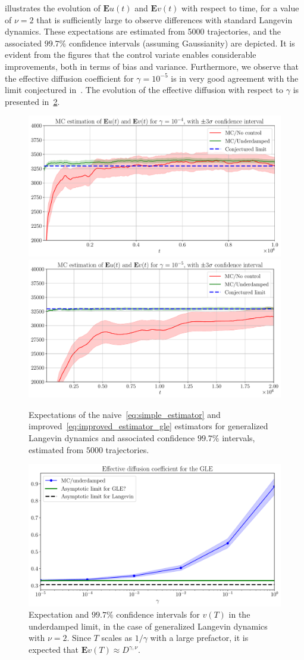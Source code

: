 \documentclass[11pt,a4paper]{article}
\newcommand{\expect}[0]{\mathbf{E}}
\theoremstyle{plain}
\numberwithin{equation}{section}
\begin{document}
 illustrates the evolution of $\expect u(t)$ and $\expect v(t)$ with respect to time,
for a value of $\nu = 2$ that is sufficiently large to observe differences with standard Langevin dynamics.
These expectations are estimated from 5000 trajectories,
and the associated $99.7\%$ confidence intervals (assuming Gaussianity) are depicted.
It is evident from the figures that the control variate enables considerable improvements,
both in terms of bias and variance.
Furthermore, we observe that the effective diffusion coefficient for $\gamma = 10^{-5}$
is in very good agreement with the limit conjectured in~\cite{GPGSUV21}.
The evolution of the effective diffusion with respect to $\gamma$ is presented in~\cref{fig:effective_diffusion_gle}.
\begin{figure}[ht]
    \centering
    \includegraphics[width=0.495\linewidth]{figures/time-gle-4.pdf}
    \includegraphics[width=0.495\linewidth]{figures/time-gle-5.pdf}
    \caption{%
        Expectations of the naive~\eqref{eq:simple_estimator} and improved~\eqref{eq:improved_estimator_gle} estimators for generalized Langevin dynamics
        and associated confidence $99.7\%$ intervals,
        estimated from $5000$ trajectories.
    }
    \label{fig:effective_diffusion_time_gle}
\end{figure}
\begin{figure}[ht]
    \centering
    \includegraphics[width=0.75\linewidth]{figures/mobility_gle.pdf}
    \caption{%
        Expectation and $99.7\%$ confidence intervals for $v(T)$ in the underdamped limit,
        in the case of generalized Langevin dynamics with $\nu = 2$.
        Since $T$ scales as $1/\gamma$ with a large prefactor,
        it is expected that $\expect v(T) \approx D^{\gamma,\nu}$.
    }
    \label{fig:effective_diffusion_gle}
\end{figure}
\end{document}
